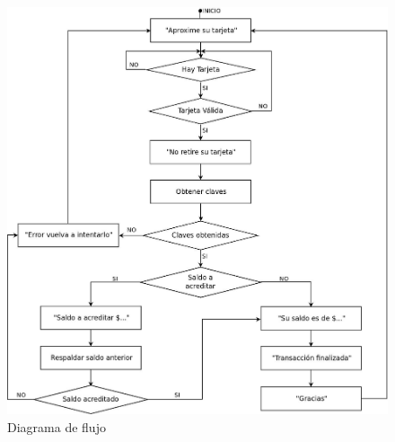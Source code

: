 \begin{figure}[H]
\centering
  \begin{center}
   \includegraphics[scale=.35]{Imagenes/flujo.jpg}
  \end{center}
  \caption{Diagrama de flujo}\label{Fig:HW} 
\end{figure}